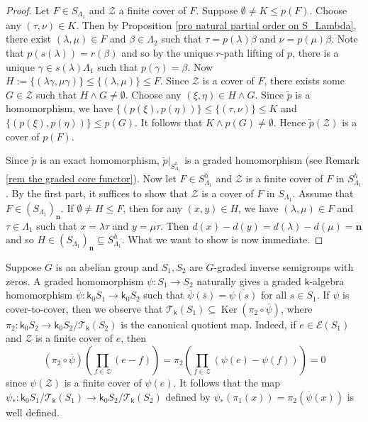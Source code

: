 \documentclass[a4paper,reqno,11pt]{amsart}
\numberwithin{equation}{section}
\theoremstyle{definition}
\theoremstyle{remark}
\newcommand{\Ker}{\operatorname{Ker}}
\newcommand{\N}{\mathbf{n}}
\begin{document}
\begin{proof}
Let $F\in S_{\Lambda_1}$ and $\mathcal{Z}$ a finite cover of $F$. Suppose $\emptyset\neq K\le p(F)$. Choose any $(\tau,\nu)\in K$. Then by Proposition \ref{pro natural partial order on S_Lambda}, there exist $(\lambda,\mu)\in F$ and $\beta\in \Lambda_2$ such that $\tau=p(\lambda)\beta$ and $\nu=p(\mu)\beta$. Note that $p(s(\lambda))=r(\beta)$ and so by the unique $r$-path lifting of $p$, there is a unique $\gamma\in s(\lambda)\Lambda_1$ such that $p(\gamma)=\beta$. Now $H:=\{(\lambda\gamma,\mu\gamma)\}\le \{(\lambda,\mu)\}\le F$. Since $\mathcal{Z}$ is a cover of $F$, there exists some $G\in \mathcal{Z}$ such that $H\wedge G\neq \emptyset$. Choose any $(\xi,\eta)\in H\wedge G$. Since $\tilde{p}$ is a homomorphism, we have $\{(p(\xi),p(\eta))\}\le \{(\tau,\nu)\}\le K$ and $\{(p(\xi),p(\eta))\}\le p(G)$. It follows that $K\wedge p(G)\neq \emptyset$. Hence $\tilde{p}(\mathcal{Z})$ is a cover of $p(F)$. 

Since $\tilde{p}$ is an exact homomorphism, $\tilde{p}|_{S_{\Lambda_1}^h}$ is a graded homomorphism (see Remark \ref{rem the graded core functor}). Now let $F\in S_{\Lambda_1}^h$ and $\mathcal{Z}$ is a finite cover of $F$ in $S_{\Lambda_1}^h$. By the first part, it suffices to show that $\mathcal{Z}$ is a cover of $F$ in $S_{\Lambda_1}$. Assume that $F\in (S_{\Lambda_1})_\N$. If $\emptyset \neq H\le F$, then for any $(x,y)\in H$, we have $(\lambda,\mu)\in F$ and $\tau\in \Lambda_1$ such that $x=\lambda\tau$ and $y=\mu\tau$. Then $d(x)-d(y)=d(\lambda)-d(\mu)=\N$ and so $H\in (S_{\Lambda_1})_\N\subseteq S_{\Lambda_1}^h$. What we want to show is now immediate.
\end{proof}

Suppose $G$ is an abelian group and $S_1,S_2$ are $G$-graded inverse semigroups with zeros. A graded homomorphism $\psi:S_1\longrightarrow S_2$ naturally gives a graded $\mathsf{k}$-algebra homomorphism $\overline{\psi}:\mathsf{k}_0S_1\longrightarrow \mathsf{k}_0S_2$ such that $\overline{\psi}(\overline{s})=\overline{\psi(s)}$ for all $s\in S_1$. If $\psi$ is cover-to-cover, then we observe that $\mathcal{T}_\mathsf{k}(S_1)\subseteq \Ker(\pi_2\circ \overline{\psi})$, where $\pi_2:\mathsf{k}_0S_2\longrightarrow \mathsf{k}_0S_2/{\mathcal{T}_\mathsf{k}(S_2)}$ is the canonical quotient map. Indeed, if $e\in \mathcal{E}(S_1)$ and $\mathcal{Z}$ is a finite cover of $e$, then \[(\pi_2\circ \overline{\psi})\left(\displaystyle{\prod_{f\in \mathcal{Z}}}(e-f)\right)=\pi_2\left(\displaystyle{\prod_{f\in \mathcal{Z}}}(\psi(e)-\psi(f))\right)=0\] since $\psi(\mathcal{Z})$ is a finite cover of $\psi(e)$. It follows that the map $\psi_*:\mathsf{k}_0S_1/{\mathcal{T}_\mathsf{k}(S_1)}\longrightarrow \mathsf{k}_0S_2/{\mathcal{T}_\mathsf{k}(S_2)}$ defined by $\psi_*(\pi_1(x))=\pi_2(\overline{\psi}(x))$ is well defined. 
\end{document}

